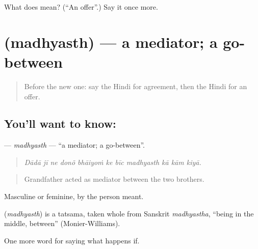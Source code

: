 \begin{tcolorbox}[breakable,colback=teal!4,colframe=teal!35!black,title={Before you move on}]
What does  mean? (\textquotedblleft{}An offer\textquotedblright{}.) Say it once more.
\end{tcolorbox}
\section[\texorpdfstring{\hi{मध्यस्थ} (madhyasth)}{मध्यस्थ (madhyasth)}]{ (madhyasth) — a mediator; a go-between}

\label{lesson:HI-C542-madhyasth}



\begin{quote}
Before the new one: say the Hindi for agreement, then the Hindi for an offer.
\end{quote}

\subsection*{You'll want to know: }
\textbf{} — \emph{madhyasth} — \textquotedblleft{}a mediator; a go-between\textquotedblright{}.

\begin{quote}
          
\end{quote}

\begin{quote}
\emph{Dādā jī ne donõ bhāiyoṁ ke bīc madhyasth kā kām kiyā.}
\end{quote}

\begin{quote}
Grandfather acted as mediator between the two brothers.
\end{quote}

Masculine or feminine, by the person meant.

\begin{cousinweb}
\textbf{} (\emph{madhyasth}) is a tatsama, taken whole from Sanskrit \emph{madhyastha}, \textquotedblleft{}being in the middle, between\textquotedblright{} (Monier-Williams).
\end{cousinweb}

\begin{grammarlens}[title={What you've built}]
One more word for saying what happens if.
\end{grammarlens}


